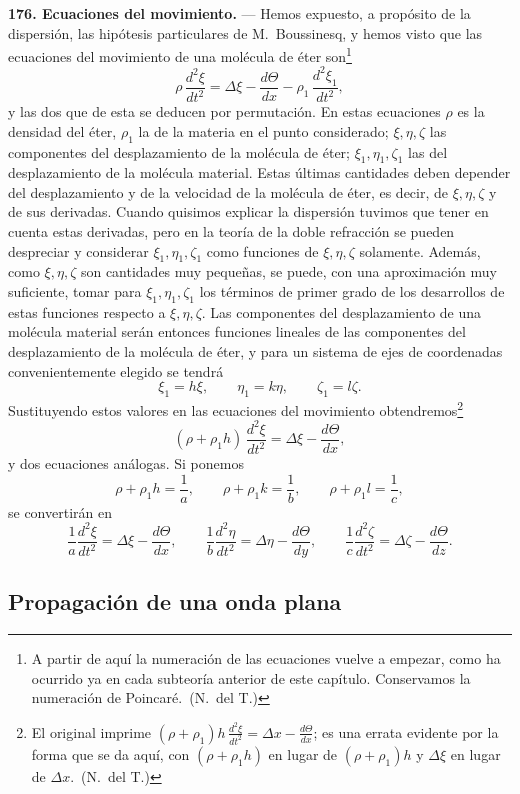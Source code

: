 \noindent\textbf{176. Ecuaciones del movimiento.} — Hemos expuesto, a
propósito de la dispersión, las hipótesis particulares de M.~Boussinesq, y
hemos visto que las ecuaciones del movimiento de una molécula de éter
son\footnote{A partir de aquí la numeración de las ecuaciones vuelve a
empezar, como ha ocurrido ya en cada subteoría anterior de este capítulo.
Conservamos la numeración de Poincaré.~(N.~del T.)}
\[
\rho\,\frac{d^2\xi}{dt^2}=\Delta\xi-\frac{d\Theta}{dx}-\rho_1\,\frac{d^2\xi_1}{dt^2},
\]
y las dos que de esta se deducen por permutación. En estas ecuaciones
$\rho$ es la densidad del éter, $\rho_1$ la de la materia en el punto
considerado; $\xi,\eta,\zeta$ las componentes del desplazamiento de la
molécula de éter; $\xi_1,\eta_1,\zeta_1$ las del desplazamiento de la
molécula material. Estas últimas cantidades deben depender del
desplazamiento y de la velocidad de la molécula de éter, es decir, de
$\xi,\eta,\zeta$ y de sus derivadas. Cuando quisimos explicar la
dispersión tuvimos que tener en cuenta estas derivadas, pero en la teoría
de la doble refracción se pueden despreciar y considerar
$\xi_1,\eta_1,\zeta_1$ como funciones de $\xi,\eta,\zeta$ solamente.
Además, como $\xi,\eta,\zeta$ son cantidades muy pequeñas, se puede, con
una aproximación muy suficiente, tomar para $\xi_1,\eta_1,\zeta_1$ los
términos de primer grado de los desarrollos de estas funciones respecto a
$\xi,\eta,\zeta$. Las componentes del desplazamiento de una molécula
material serán entonces funciones lineales de las componentes del
desplazamiento de la molécula de éter, y para un sistema de ejes de
coordenadas convenientemente elegido se tendrá
\[
\xi_1=h\xi,\qquad \eta_1=k\eta,\qquad \zeta_1=l\zeta.
\]
Sustituyendo estos valores en las ecuaciones del movimiento obtendremos\footnote{El original imprime
$(\rho+\rho_1)h\,\frac{d^2\xi}{dt^2}=\Delta x-\frac{d\Theta}{dx}$; es una
errata evidente por la forma que se da aquí, con $(\rho+\rho_1h)$ en lugar
de $(\rho+\rho_1)h$ y $\Delta\xi$ en lugar de $\Delta x$.~(N.~del T.)}
\[
(\rho+\rho_1h)\,\frac{d^2\xi}{dt^2}=\Delta\xi-\frac{d\Theta}{dx},
\]
y dos ecuaciones análogas. Si ponemos
\[
\rho+\rho_1h=\frac1a,\qquad \rho+\rho_1k=\frac1b,\qquad \rho+\rho_1l=\frac1c,
\]
se convertirán en
\begin{equation}
\frac1a\frac{d^2\xi}{dt^2}=\Delta\xi-\frac{d\Theta}{dx},\qquad
\frac1b\frac{d^2\eta}{dt^2}=\Delta\eta-\frac{d\Theta}{dy},\qquad
\frac1c\frac{d^2\zeta}{dt^2}=\Delta\zeta-\frac{d\Theta}{dz}.
\tag{1}
\end{equation}

\subsection{Propagación de una onda plana}

